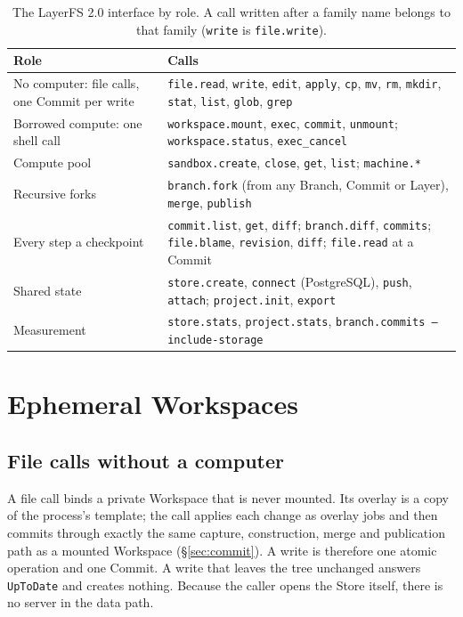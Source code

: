 \documentclass[letterpaper,twocolumn,10pt]{article}
\newcommand{\sys}{LayerFS}
\newcommand{\ws}{Workspace}
\begin{document}
\begin{table}[t]
\centering
\footnotesize
\begin{tabular}{@{}p{}p{}@{}}
\toprule
Role & Calls \\
\midrule
No computer: file calls, one Commit per write &
\texttt{file.read}, \texttt{write}, \texttt{edit}, \texttt{apply}, \texttt{cp},
\texttt{mv}, \texttt{rm}, \texttt{mkdir}, \texttt{stat}, \texttt{list},
\texttt{glob}, \texttt{grep} \\
\addlinespace
Borrowed compute: one shell call &
\texttt{workspace.mount}, \texttt{exec}, \texttt{commit}, \texttt{unmount};
\texttt{workspace.status}, \texttt{exec\_cancel} \\
\addlinespace
Compute pool &
\texttt{sandbox.create}, \texttt{close}, \texttt{get}, \texttt{list};
\texttt{machine.*} \\
\addlinespace
Recursive forks &
\texttt{branch.fork} (from any Branch, Commit or Layer), \texttt{merge},
\texttt{publish} \\
\addlinespace
Every step a checkpoint &
\texttt{commit.list}, \texttt{get}, \texttt{diff}; \texttt{branch.diff},
\texttt{commits}; \texttt{file.blame}, \texttt{revision}, \texttt{diff};
\texttt{file.read} at a Commit \\
\addlinespace
Shared state &
\texttt{store.create}, \texttt{connect} (PostgreSQL), \texttt{push},
\texttt{attach}; \texttt{project.init}, \texttt{export} \\
\addlinespace
Measurement &
\texttt{store.stats}, \texttt{project.stats},
\texttt{branch.commits --include-storage} \\
\bottomrule
\end{tabular}
\caption{The \sys{} 2.0 interface by role. A call written after a family
name belongs to that family (\texttt{write} is \texttt{file.write}).}
\label{tab:api}
\end{table}

\section{Ephemeral Workspaces}
\label{sec:workspaces}

\subsection{File calls without a computer}
\label{sec:filecalls}

A file call binds a private \ws{} that is never mounted. Its overlay is a
copy of the process's template; the call applies each change as overlay
jobs and then commits through exactly the same capture, construction, merge
and publication path as a mounted \ws{} (\S\ref{sec:commit}). A write is
therefore one atomic operation and one Commit. A write that leaves the tree
unchanged answers \texttt{UpToDate} and creates nothing. Because the caller
opens the Store itself, there is no server in the data path.
\end{document}

